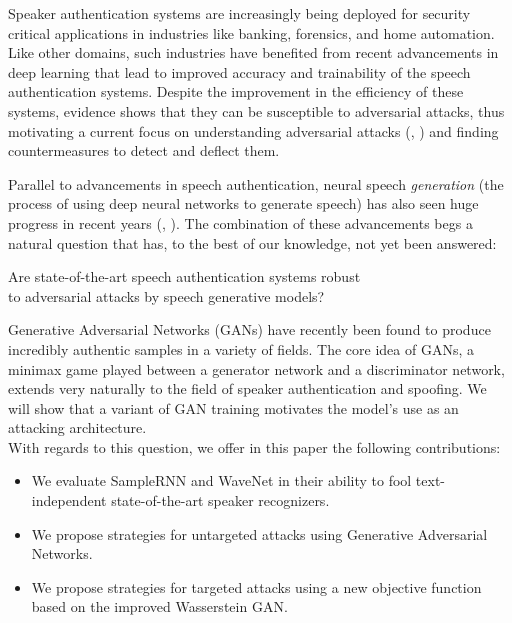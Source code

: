Speaker authentication systems are increasingly being deployed for security
critical applications in industries like banking, forensics, and home automation. Like
other domains, such industries have benefited from recent advancements in deep
learning that lead to improved accuracy and trainability of the speech authentication systems.
Despite the improvement in the efficiency of these systems, evidence shows that
they can be susceptible to adversarial attacks\cite{wu2015spoofing}, thus motivating a current focus on understanding adversarial attacks (\cite{szegedy2013intriguing}, \cite{goodfellow2014explaining}) and finding countermeasures to detect and deflect them. 

Parallel to advancements in speech authentication, neural speech \textit{generation} (the process of using deep neural networks to generate speech) has also seen huge progress in recent years (\cite{wang2017tacotron}, \cite{arik2017deep}). 
The combination of these advancements begs a natural question that has, to the
best of our knowledge, not yet been answered:
\begin{center}
Are state-of-the-art speech authentication systems robust \\to adversarial attacks by speech generative models?
\end{center}


Generative Adversarial Networks (GANs) have recently been found to produce incredibly  authentic samples in a variety of fields. The core idea of GANs, a minimax game played between a generator network and a discriminator network, extends very naturally to the field of speaker authentication and spoofing. We will show that a variant of GAN training motivates the model's use as an attacking architecture.  \\


With regards to this question, we offer in this paper the following contributions:
\begin{itemize}
\item We evaluate SampleRNN and WaveNet in their ability to fool text-independent state-of-the-art speaker recognizers.
\item We propose strategies for untargeted attacks using Generative Adversarial Networks.
\item We propose strategies for targeted attacks using a new objective function based on the improved Wasserstein GAN.
\end{itemize}

